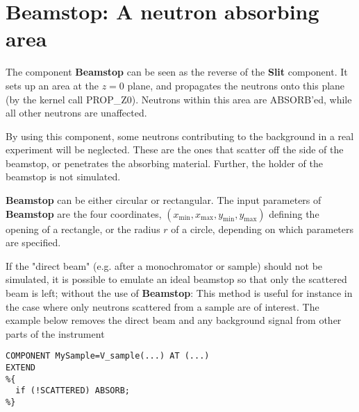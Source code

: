 \section{Beamstop: A neutron absorbing area}
\label{beamstop}


The component \textbf{Beamstop} can be seen as the reverse of
the \textbf{Slit} component.
It sets up an area at the $z=0$ plane, and propagates the neutrons
onto this plane (by the kernel call PROP\_Z0).
Neutrons within this area are ABSORB'ed,
while all other neutrons are unaffected.

By using this component, some neutrons contributing to the background
in a real experiment will be neglected.
These are the ones that scatter off the side
of the beamstop, or penetrates the absorbing material.
Further, the holder of the beamstop is not simulated.

\textbf{Beamstop} can be either circular or rectangular.
The input parameters of \textbf{Beamstop} are the four coordinates,
$(x_\textrm{min}, x_\textrm{max}, y_\textrm{min}, y_\textrm{max})$
defining the opening of a rectangle, or the radius $r$ of
a circle, depending on which parameters are specified.

If the "direct beam" (e.g. after a monochromator or sample) should not be
simulated, it is possible to emulate an ideal beamstop 
so that only the scattered beam is left;
without the use of \textbf{Beamstop}:
This method is useful for instance in the case where only neutrons 
scattered from a sample are of interest. 
The example below removes the direct beam and 
any background signal from other parts of the instrument
\begin{lstlisting}
COMPONENT MySample=V_sample(...) AT (...)
EXTEND
%{
  if (!SCATTERED) ABSORB;
%}
\end{lstlisting}
